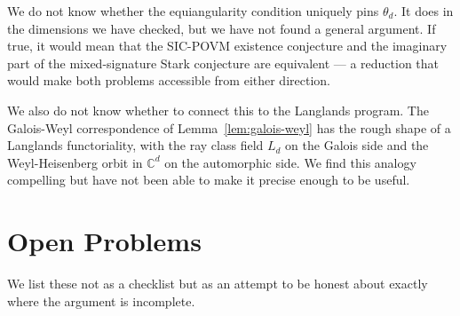 \documentclass[12pt]{article}
\theoremstyle{plain}
\theoremstyle{definition}
\theoremstyle{remark}
\newcommand{\bC}{\mathbb{C}}
\begin{document}
We do not know whether the equiangularity condition uniquely pins $\theta_d$. It does in the dimensions we have checked, but we have not found a general argument. If true, it would mean that the SIC-POVM existence conjecture and the imaginary part of the mixed-signature Stark conjecture are equivalent — a reduction that would make both problems accessible from either direction.

We also do not know whether to connect this to the Langlands program. The Galois-Weyl correspondence of Lemma~\ref{lem:galois-weyl} has the rough shape of a Langlands functoriality, with the ray class field $L_d$ on the Galois side and the Weyl-Heisenberg orbit in $\bC^d$ on the automorphic side. We find this analogy compelling but have not been able to make it precise enough to be useful.

\section{Open Problems}

We list these not as a checklist but as an attempt to be honest about exactly where the argument is incomplete.
\end{document}
